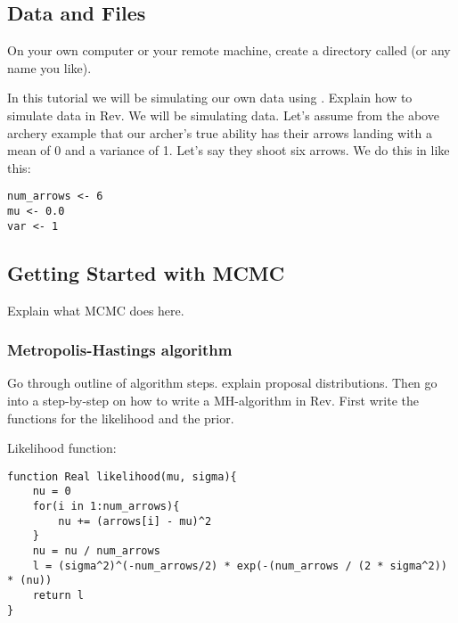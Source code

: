 \medskip
\subsection{Data and Files}\label{subsect:Exercise-DataFiles}

{\begin{framed}
On your own computer or your remote machine, create a directory called {\textcolor{red}{}} (or any name you like).

\end{framed}}

In this tutorial we will be simulating our own data using \RevBayes. Explain how to simulate data in Rev. We will be simulating data. Let's assume from the above archery example that our archer's true ability has their arrows landing with a mean of 0 and a variance of 1. Let's say they shoot six arrows. We do this in \RevBayes like this:

 {\tt \begin{snugshade*}
\begin{lstlisting}
num_arrows <- 6
mu <- 0.0
var <- 1
\end{lstlisting}
\end{snugshade*}}



\bigskip
\subsection{Getting Started with MCMC\label{subsect:Exercise-GetStart}}

Explain what MCMC does here.

\subsubsection{Metropolis-Hastings algorithm}

Go through outline of algorithm steps. explain proposal distributions. Then go into a step-by-step on how to write a MH-algorithm in Rev. First write the functions for the likelihood and the prior. 

Likelihood function:

 {\tt \begin{snugshade*}
\begin{lstlisting}
function Real likelihood(mu, sigma){
	nu = 0
	for(i in 1:num_arrows){
		nu += (arrows[i] - mu)^2 
	}
	nu = nu / num_arrows
	l = (sigma^2)^(-num_arrows/2) * exp(-(num_arrows / (2 * sigma^2)) * (nu))
	return l
}
\end{lstlisting}
\end{snugshade*}}

